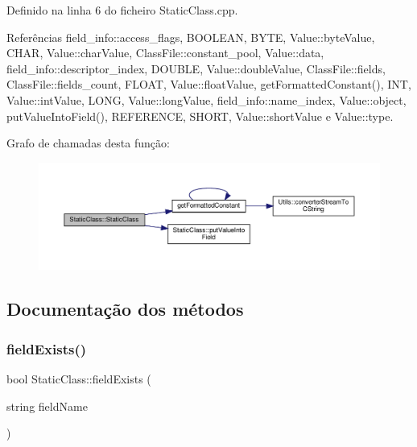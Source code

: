 Definido na linha 6 do ficheiro Static\+Class.\+cpp.



Referências field\+\_\+info\+::access\+\_\+flags, B\+O\+O\+L\+E\+AN, B\+Y\+TE, Value\+::byte\+Value, C\+H\+AR, Value\+::char\+Value, Class\+File\+::constant\+\_\+pool, Value\+::data, field\+\_\+info\+::descriptor\+\_\+index, D\+O\+U\+B\+LE, Value\+::double\+Value, Class\+File\+::fields, Class\+File\+::fields\+\_\+count, F\+L\+O\+AT, Value\+::float\+Value, get\+Formatted\+Constant(), I\+NT, Value\+::int\+Value, L\+O\+NG, Value\+::long\+Value, field\+\_\+info\+::name\+\_\+index, Value\+::object, put\+Value\+Into\+Field(), R\+E\+F\+E\+R\+E\+N\+CE, S\+H\+O\+RT, Value\+::short\+Value e Value\+::type.

Grafo de chamadas desta função\+:
\nopagebreak
\begin{figure}[H]
\begin{center}
\leavevmode
\includegraphics[width=350pt]{classStaticClass_a6c0e4d8842888a97160f1e815c8e6ac3_cgraph}
\end{center}
\end{figure}


\subsection{Documentação dos métodos}
\mbox{\label{classStaticClass_a4d2f7ca3157461323a6e471328ed7092}} 
\subsubsection{\texorpdfstring{field\+Exists()}{fieldExists()}}
{\footnotesize\ttfamily bool Static\+Class\+::field\+Exists (\begin{DoxyParamCaption}\item[{string}]{field\+Name }\end{DoxyParamCaption})}



